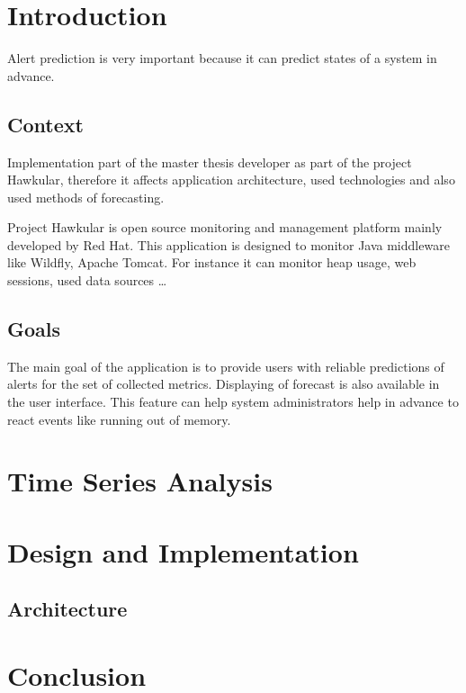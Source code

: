 
\chapter{Introduction} 
Alert prediction is very important because it can predict states of a system in
advance.  

\section{Context}
Implementation part of the master thesis developer as part of the project
Hawkular, therefore it affects application architecture, used technologies and
also used methods of forecasting.

Project Hawkular is open source monitoring and management platform mainly
developed by Red Hat. This application is designed to monitor Java middleware 
like Wildfly, Apache Tomcat. For instance it can monitor heap usage, web
sessions, used data sources \dots

\section{Goals}
The main goal of the application is to provide users with reliable predictions
of alerts for the set of collected metrics. Displaying of forecast is also
available in the user interface. This feature can help system administrators
help in advance to react events like running out of memory.

\chapter{Time Series Analysis}

\chapter{Design and Implementation}
\section{Architecture}

\chapter{Conclusion}
\cite{rfc_owamp} %

